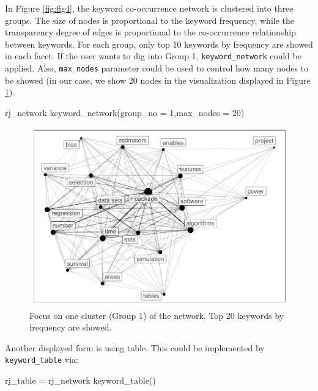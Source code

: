 In Figure \ref{fig:fig4}, the keyword co-occurrence network is clustered
into three groups. The size of nodes is proportional to the keyword
frequency, while the transparency degree of edges is proportional to the
co-occurrence relationship between keywords. For each group, only top 10
keywords by frequency are showed in each facet. If the user wants to dig
into Group 1, \texttt{keyword\_network} could be applied. Also,
\texttt{max\_nodes} parameter could be used to control how many nodes to
be showed (in our case, we show 20 nodes in the visualization displayed
in Figure \ref{fig:fig5}).

\begin{Schunk}
\begin{Sinput}
rj_network %
  keyword_network(group_no = 1,max_nodes = 20) 
\end{Sinput}
\begin{figure}

{\centering \includegraphics{article_files/figure-latex/fig5-1} 

}

\caption[Focus on one cluster (Group 1) of the network]{Focus on one cluster (Group 1) of the network. Top 20 keywords by frequency are showed.}\label{fig:fig5}
\end{figure}
\end{Schunk}

Another displayed form is using table. This could be implemented by
\texttt{keyword\_table} via:

\begin{Schunk}
\begin{Sinput}
rj_table = rj_network %
  keyword_table() 
\end{Sinput}
\end{Schunk}

